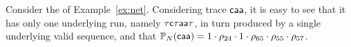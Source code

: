 \begin{example} %
  \label{ex:trace}
Consider the \uswn \net of Example~\ref{ex:net}. Considering trace $\mathsf{caa}$, it is easy to see that it has only one underlying run, namely $\mathsf{\tau c \tau a a \tau}$, in turn produced by a single underlying valid sequence, and that
$\mathbb{P}_{N}(\mathsf{caa}) = 1 \cdot \rho_{24} \cdot 1 \cdot \rho_{65} \cdot \rho_{55} \cdot \rho_{57}$.
\end{example}




